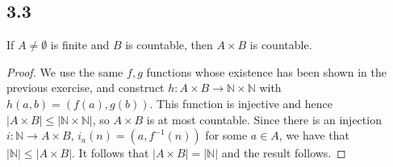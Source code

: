 \subsection*{3.3} If $A \neq \emptyset$ is finite and $B$ is countable, then $A \times B$ is countable.

\begin{proof}
We use the same $f,g$ functions whose existence has been shown in the previous exercise, and construct $h: A \times B \rightarrow \mathbb{N} \times \mathbb{N}$ with $h(a,b) = (f(a), g(b))$. This function is injective and hence $|A \times B| \leq |\mathbb{N} \times \mathbb{N}|$, so $A \times B$ is at most countable. Since there is an injection $i: \mathbb{N} \rightarrow A \times B$, $i_a(n) = (a, f^{-1}(n))$ for some $a \in A$, we have that $|\mathbb{N}| \leq |A \times B|$. It follows that $|A \times B| = |\mathbb{N}|$ and the result follows.
\end{proof}

